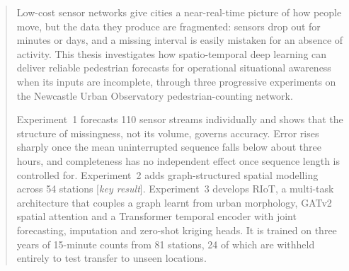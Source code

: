 
\begin{abstract}
Low-cost sensor networks give cities a near-real-time picture of how
people move, but the data they produce are fragmented: sensors drop out
for minutes or days, and a missing interval is easily mistaken for an
absence of activity. This thesis investigates how spatio-temporal deep
learning can deliver reliable pedestrian forecasts for operational
situational awareness when its inputs are incomplete, through three
progressive experiments on the Newcastle Urban Observatory
pedestrian-counting network.

Experiment~1 forecasts 110 sensor streams individually and shows that
the structure of missingness, not its volume, governs accuracy. Error
rises sharply once the mean uninterrupted sequence falls below about
three hours, and completeness has no independent effect once sequence
length is controlled for. Experiment~2 adds graph-structured spatial
modelling across 54 stations
[\textit{key result}]. Experiment~3 develops RIoT, a multi-task
architecture that couples a graph learnt from urban morphology, GATv2
spatial attention and a Transformer temporal encoder with joint
forecasting, imputation and zero-shot kriging heads. It is trained on
three years of 15-minute counts from 81 stations, 24 of which are
withheld entirely to test transfer to unseen locations.


\end{abstract}
